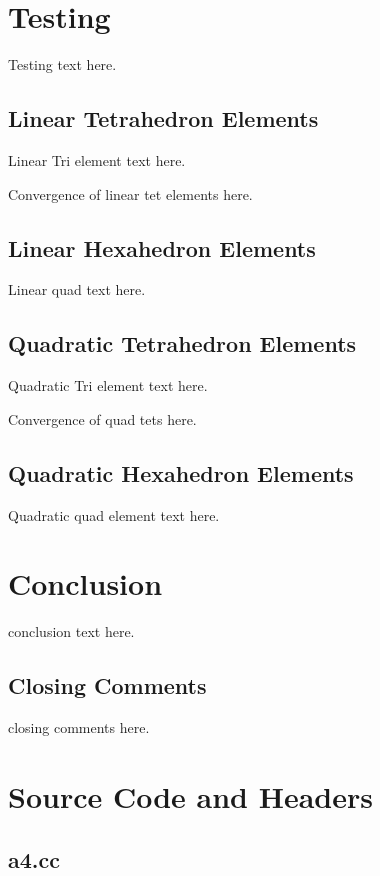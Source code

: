 \documentclass[a4paper, 12pt]{article}
\begin{document}
\section{Testing} \label{sec:testing}
Testing text here.

\subsection{Linear Tetrahedron Elements} \label{subsec:linTet}
Linear Tri element text here.

Convergence of linear tet elements here.

\subsection{Linear Hexahedron Elements} \label{subsec:linHex}
Linear quad text here.

\subsection{Quadratic Tetrahedron Elements} \label{subsec:quadTet}
Quadratic Tri element text here.

Convergence of quad tets here.

\subsection{Quadratic Hexahedron Elements} \label{subsec:quadHex}
Quadratic quad element text here.

\section{Conclusion} \label{sec:conclusion}
conclusion text here.

\subsection{Closing Comments} \label{sec:comments}
closing comments here.

\newpage
\appendix
\section{Source Code and Headers} \label{sec:code}

\subsection{a4.cc} \label{subsec:a4.cc}

\end{document}

